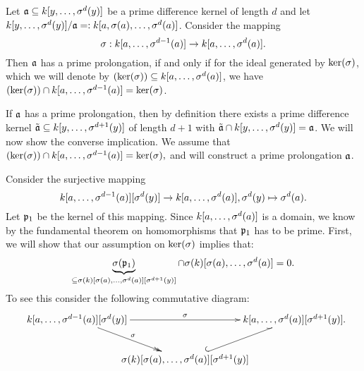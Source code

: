  
\begin{prop}
Let $\mathfrak{a} \subseteq k[y,\ldots,\sigma^d(y)]$ be a prime difference kernel of length $d$ and let $k[y,\ldots,\sigma^d(y)]/\mathfrak{a} =: k[a,\sigma(a),\ldots,\sigma^d(a)]$. Consider the mapping 
\[ \sigma: k[a,\ldots,\sigma^{d-1}(a)] \rightarrow k[a,\ldots,\sigma^d(a)]. \]
Then $\mathfrak{a}$ has a prime prolongation, if and only if for the ideal generated by $\operatorname{ker}(\sigma)$, which we will denote by $(\operatorname{ker}(\sigma)) \subseteq k[a,\ldots,\sigma^d(a)]$, we have \\ $(\operatorname{ker}(\sigma)) \cap k[a,\ldots,\sigma^{d-1}(a)] = \operatorname{ker}(\sigma)$. 
\begin{bew}
If $\mathfrak{a}$ has a prime prolongation, then by definition there exists a prime difference kernel $\tilde {\mathfrak{a}} \subseteq k[y,\ldots,\sigma^{d+1}(y)]$ of length $d+1$ with $\tilde {\mathfrak{a}} \cap k[y,\ldots,\sigma^d(y)] = \mathfrak{a}$.
We will now show the converse implication. We assume that $(\operatorname{ker}(\sigma)) \cap k[a,\ldots,\sigma^{d-1}(a)] = \operatorname{ker}(\sigma),$ and will construct a prime prolongation $\mathfrak{a}$.

Consider the surjective mapping 
\[ k[a,\ldots,\sigma^{d-1}(a)][\sigma^d(y)] \rightarrow k[a,\ldots,\sigma^d(a)], \sigma^d(y) \mapsto \sigma^d(a). \]
Let $\mathfrak{p}_1$ be the kernel of this mapping. Since $k[a,\ldots,\sigma^d(a)]$ is a domain, we know by the fundamental theorem on homomorphisms that $\mathfrak{p}_1$ has to be prime. 
First, we will show that our assumption on $\operatorname{ker}(\sigma)$ implies that:
\begin{equation}\label{skercapsk} \underbrace{\sigma(\mathfrak{p}_1)}_{\subseteq \sigma(k)[\sigma(a),\ldots,\sigma^d(a)][\sigma^{d+1}(y)]} \cap \sigma(k)[\sigma(a),\ldots,\sigma^d(a)] = 0. \end{equation}
To see this consider the following commutative diagram:
\[
\begin{xy}
\xymatrixcolsep{-1pc}
 \xymatrix{
      k[a,\ldots,\s^{d-1}(a)][\s^d(y)] \ar[rr]^\s \ar@{->>}[rd]^\s  &     &  k[a,\ldots,\s^d(a)][\s^{d+1}(y)]   \\
      &  \s(k)[\s(a),\ldots,\s^d(a)][\s^{d+1}(y)] \ar@^{(->}[ur] &  }
\end{xy}.
\]


\end{bew}
\end{prop}
